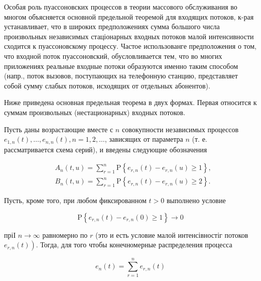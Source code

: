 \documentclass[10pt]{article}
\begin{document}
Особая роль пуассоновских процессов в теории массового обслуживания во многом объясняется основной предельной теоремой для входящих потоков, к-рая устанавливает, что в широких предположениях сумма большого числа произвольных независимых стаціонарных входных потоков малой интенсивности сходится к пуассоновскому процессу. Частое использованге предположения о том, что входной поток пуассоновский, обусловливается тем, что во многих приложениях реальные входные потоки образуются именно таким способом (напр., поток вызовов, поступающих на телефонную станцию, представляет собой сумму слабых потоков, исходящих от отдельных абонентов).



Ниже приведена основная предельная теорема в двух формах. Первая относится к суммам произвольных (нестационарных) входных потоков.



Пусть даны возрастающие вместе с $n$ совокупности независимых процессов $e_{1, n}(t), \ldots, e_{n, n}(t), n=1,2, \ldots$, зависящих от параметра $n$ (т. е. рассматривается схема серий), и введены следующие обозначения



\[

\begin{aligned}

& A_{n}(t, u)=\sum_{r=1}^{n} \mathrm{P}\left\{e_{r, n}(t)-e_{r, n}(u) \geqslant 1\right\}, \\

& B_{n}(t, u)=\sum_{r=1}^{n} \mathrm{P}\left\{e_{r, n}(t)-e_{r, n}(u) \geqslant 2\right\} .

\end{aligned}

\]



Пусть, кроме того, при любом фиксированном $t>0$ выполнено условие



\[

\mathrm{P}\left\{e_{r, n}(t)-e_{r, n}(0) \geqslant 1\right\} \longrightarrow 0

\]



пріІ $n \rightarrow \infty$ равномерно по $r$ (это и есть условие малой интенсівностіг потоков $\left.e_{r, n}(t)\right)$. Тогда, для того чтобы конечномерные распределения процесса



\[

e_{n}(t)=\sum_{r=1}^{n} e_{r, n}(t)

\]
\end{document}
